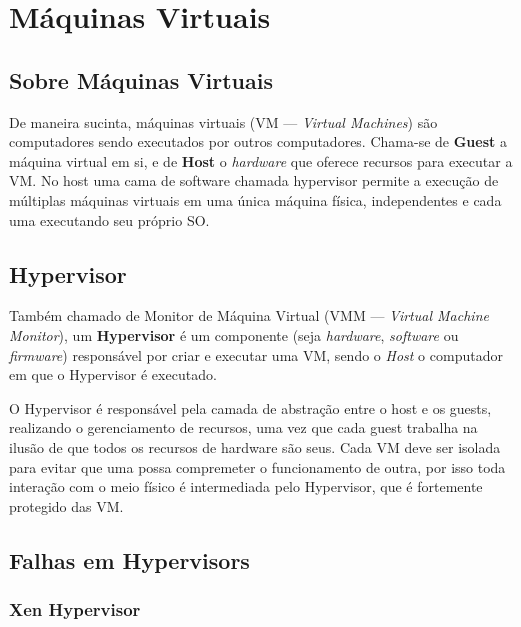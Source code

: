 \documentclass{report}
\title{\todo{A gente descobre depois}}
\author{João Gabriel Trombeta\\
        João Paulo Taylor Ienczak Zanette\\
        Ranieri Schroeder Althoff}
\date{\today}
\begin{document}
\maketitle

\tableofcontents

\chapter{Máquinas Virtuais}

\section{Sobre Máquinas Virtuais}

De maneira sucinta, máquinas virtuais (VM --- \textit{Virtual Machines}) são
computadores sendo executados por outros computadores. Chama-se de
\textbf{Guest} a máquina virtual em si, e de \textbf{Host} o \textit{hardware}
que oferece recursos para executar a VM\@. No host uma cama de software chamada
hypervisor permite a execução de múltiplas máquinas virtuais em uma única
máquina física, independentes e cada uma executando seu próprio SO\@.

\section{Hypervisor}

Também chamado de Monitor de Máquina Virtual (VMM --- \textit{Virtual Machine
Monitor}), um \textbf{Hypervisor} é um componente (seja \textit{hardware},
\textit{software} ou \textit{firmware}) responsável por criar e executar uma
VM, sendo o \textit{Host} o computador em que o Hypervisor é executado.

O Hypervisor é responsável pela camada de abstração entre o host e os guests,
realizando o gerenciamento de recursos, uma vez que cada guest trabalha na
ilusão de que todos os recursos de hardware são seus. Cada VM deve ser isolada
para evitar que uma possa compremeter o funcionamento de outra, por isso toda
interação com o meio físico é intermediada pelo Hypervisor, que é fortemente
protegido das VM\@.

\section{Falhas em Hypervisors}

\subsection{Xen Hypervisor}
\end{document}
